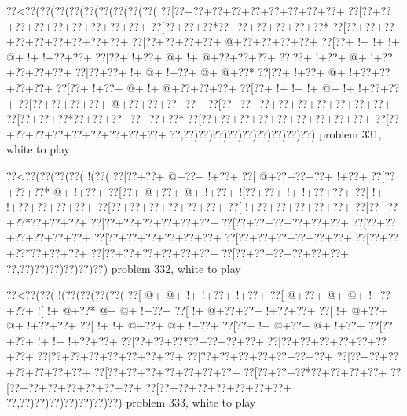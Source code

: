 \vbox{\vbox{\goo
\0??<\0??(\0??(\0??(\0??(\0??(\0??(\0??(\0??(\0??(
\0??[\0??+\0??+\0??+\0??+\0??+\0??+\0??+\0??+\0??+
\0??[\0??+\0??+\0??+\0??+\0??+\0??+\0??+\0??+\0??+
\0??[\0??+\0??+\0??*\0??+\0??+\0??+\0??+\0??+\0??*
\0??[\0??+\0??+\0??+\0??+\0??+\0??+\0??+\0??+\0??+
\0??[\0??+\0??+\0??+\0??+\- @+\0??+\0??+\0??+\0??+
\0??[\0??+\- !+\- !+\- !+\- @+\- !+\- !+\0??+\0??+
\0??[\0??+\- !+\0??+\- @+\- !+\- @+\0??+\0??+\0??+
\0??[\0??+\- !+\0??+\- @+\- !+\0??+\0??+\0??+\0??+
\0??[\0??+\0??+\- !+\- @+\- !+\0??+\- @+\- @+\0??*
\0??[\0??+\- !+\0??+\- @+\- !+\0??+\0??+\0??+\0??+
\0??[\0??+\- !+\0??+\- @+\- !+\- @+\0??+\0??+\0??+
\0??[\0??+\- !+\- !+\- !+\- @+\- !+\- !+\0??+\0??+
\0??[\0??+\0??+\0??+\0??+\- @+\0??+\0??+\0??+\0??+
\0??[\0??+\0??+\0??+\0??+\0??+\0??+\0??+\0??+\0??+
\0??[\0??+\0??+\0??*\0??+\0??+\0??+\0??+\0??+\0??*
\0??[\0??+\0??+\0??+\0??+\0??+\0??+\0??+\0??+\0??+
\0??[\0??+\0??+\0??+\0??+\0??+\0??+\0??+\0??+\0??+
\0??,\0??)\0??)\0??)\0??)\0??)\0??)\0??)\0??)\0??)
}
\hfil problem 331, white to play\hfil\break
}

\vbox{\vbox{\goo
\0??<\0??(\0??(\0??(\0??(\- !(\0??(
\0??[\0??+\0??+\- @+\0??+\- !+\0??+
\0??[\- @+\0??+\0??+\0??+\- !+\0??+
\0??[\0??+\0??+\0??*\- @+\- !+\0??+
\0??[\0??+\- @+\0??+\- @+\- !+\0??+
\- ![\0??+\0??+\- !+\- !+\0??+\0??+
\0??[\- !+\- !+\0??+\0??+\0??+\0??+
\0??[\0??+\0??+\0??+\0??+\0??+\0??+
\0??[\- !+\0??+\0??+\0??+\0??+\0??+
\0??[\0??+\0??+\0??*\0??+\0??+\0??+
\0??[\0??+\0??+\0??+\0??+\0??+\0??+
\0??[\0??+\0??+\0??+\0??+\0??+\0??+
\0??[\0??+\0??+\0??+\0??+\0??+\0??+
\0??[\0??+\0??+\0??+\0??+\0??+\0??+
\0??[\0??+\0??+\0??+\0??+\0??+\0??+
\0??[\0??+\0??+\0??*\0??+\0??+\0??+
\0??[\0??+\0??+\0??+\0??+\0??+\0??+
\0??[\0??+\0??+\0??+\0??+\0??+\0??+
\0??,\0??)\0??)\0??)\0??)\0??)\0??)
}
\hfil problem 332, white to play\hfil\break
}

\vbox{\vbox{\goo
\0??<\0??(\0??(\- !(\0??(\0??(\0??(\0??(
\0??[\- @+\- @+\- !+\- !+\0??+\- !+\0??+
\0??[\- @+\0??+\- @+\- @+\- !+\0??+\0??+
\- ![\- !+\- @+\0??*\- @+\- @+\- !+\0??+
\0??[\- !+\- @+\0??+\0??+\- !+\0??+\0??+
\0??[\- !+\- @+\0??+\- @+\- !+\0??+\0??+
\0??[\- !+\- !+\- @+\0??+\- @+\- !+\0??+
\0??[\0??+\- !+\- @+\0??+\- @+\- !+\0??+
\0??[\0??+\0??+\- !+\- !+\- !+\0??+\0??+
\0??[\0??+\0??+\0??*\0??+\0??+\0??+\0??+
\0??[\0??+\0??+\0??+\0??+\0??+\0??+\0??+
\0??[\0??+\0??+\0??+\0??+\0??+\0??+\0??+
\0??[\0??+\0??+\0??+\0??+\0??+\0??+\0??+
\0??[\0??+\0??+\0??+\0??+\0??+\0??+\0??+
\0??[\0??+\0??+\0??+\0??+\0??+\0??+\0??+
\0??[\0??+\0??+\0??*\0??+\0??+\0??+\0??+
\0??[\0??+\0??+\0??+\0??+\0??+\0??+\0??+
\0??[\0??+\0??+\0??+\0??+\0??+\0??+\0??+
\0??,\0??)\0??)\0??)\0??)\0??)\0??)\0??)
}
\hfil problem 333, white to play\hfil\break
}

